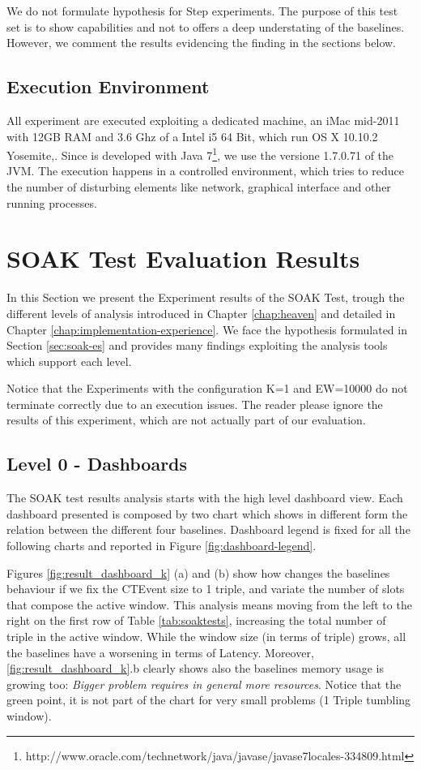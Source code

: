 We do not formulate hypothesis for Step experiments. The purpose of this test set is to show \name capabilities and not to offers a deep understating of the baselines. However, we comment the results evidencing the finding in the sections below.

\subsection{Execution Environment}\label{sec:execution-environment}

All experiment are executed exploiting a dedicated machine, an iMac mid-2011 with 12GB RAM and 3.6 Ghz of a Intel i5 64 Bit, which run OS X 10.10.2 Yosemite,. Since \name is developed with Java 7\footnote{http://www.oracle.com/technetwork/java/javase/javase7locales-334809.html}, we use the versione 1.7.0.71 of the JVM.
The execution happens in a controlled environment, which tries to reduce the number of disturbing elements like network, graphical interface and other running processes.

\section{SOAK Test Evaluation Results}\label{sec:soakres}

In this Section we present the Experiment results of the SOAK Test, trough the different levels of analysis introduced in Chapter \ref{chap:heaven} and detailed in Chapter \ref{chap:implementation-experience}. We face the hypothesis formulated in Section \ref{sec:soak-es} and provides many findings exploiting the analysis tools which support each level.

Notice that the Experiments with the configuration K=1 and EW=10000 do not terminate correctly due to an execution issues. The reader please ignore the results of this experiment, which are not actually part of our evaluation.

\subsection{Level 0 - Dashboards}

The SOAK test results analysis starts with the high level dashboard view. Each dashboard presented is composed by two chart which shows in different form the relation between the different four baselines. Dashboard legend is fixed for all the following charts and reported in Figure \ref{fig:dashboard-legend}.

Figures \ref{fig:result_dashboard_k} (a) and (b) show how changes the baselines behaviour if we fix the CTEvent size to 1 triple, and variate the number of slots that compose the active window. This analysis means moving from the left to the right on the first row of Table \ref{tab:soaktests}, increasing the total number of triple in the active window. While the window size (in terms of triple) grows, all the baselines have a worsening in terms of Latency. Moreover,  \ref{fig:result_dashboard_k}.b clearly shows also the baselines memory usage is growing too: \textit{Bigger problem requires in general more resources}. Notice that the green point, it is not part of the chart for very small problems (1 Triple tumbling window).

